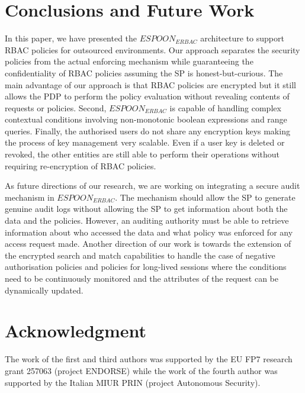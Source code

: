 \documentclass[final,5p,times,twocolumn]{elsarticle}
\begin{document}
\section{Conclusions and Future Work}
\label{sec:conclusions-future-work}
In this paper, we have presented the $\mathit{ESPOON_{ERBAC}}$ architecture to support RBAC policies for outsourced environments. Our approach separates the security policies from the actual enforcing mechanism while guaranteeing the confidentiality of RBAC policies assuming the SP is honest-but-curious. The main advantage of our approach is that RBAC policies are encrypted but it still allows the PDP to perform the policy evaluation without revealing contents of requests or policies. Second, $\mathit{ESPOON_{ERBAC}}$ is capable of handling complex contextual conditions involving non-monotonic boolean expressions and range queries. Finally, the authorised users do not share any encryption keys making the process of key management very scalable. Even if a user key is deleted or revoked, the other entities are still able to perform their operations without requiring re-encryption of RBAC policies.

As future directions of our research, we are working on integrating a secure audit mechanism in $\mathit{ESPOON_{ERBAC}}$. The mechanism should allow the SP to generate genuine audit logs without allowing the SP to get information about both the data and the policies. However, an auditing authority must be able to retrieve information about who accessed the data and what policy was enforced for any access request made. Another direction of our work is towards the extension of the encrypted search and match capabilities to handle the case of negative authorisation policies and policies for long-lived sessions where the conditions need to be continuously monitored and the attributes of the request can be dynamically updated.


\section*{Acknowledgment}
The work of the first and third authors was supported by the EU FP7 research grant 257063 (project ENDORSE) while the work of the fourth author was supported by the Italian MIUR PRIN (project Autonomous Security).









 
\end{document}
